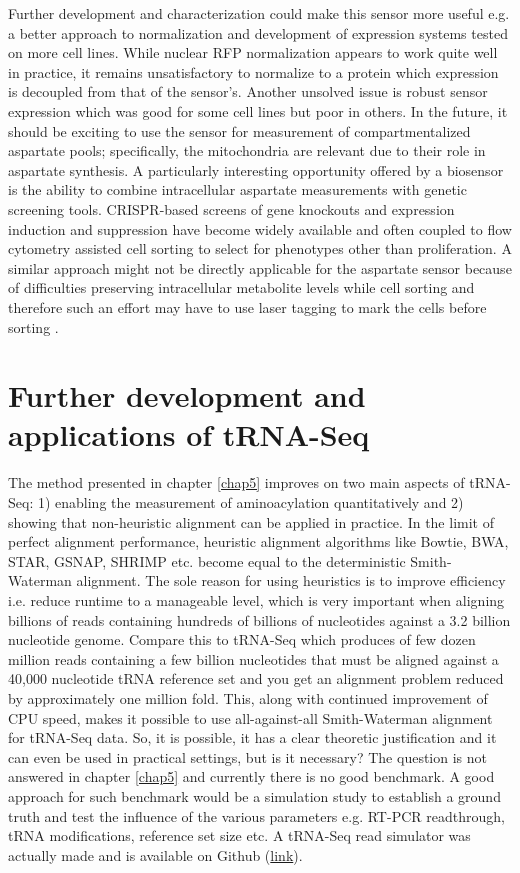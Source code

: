 Further development and characterization could make this sensor more useful e.g. a better approach to normalization and development of expression systems tested on more cell lines.
While nuclear RFP normalization appears to work quite well in practice, it remains unsatisfactory to normalize to a protein which expression is decoupled from that of the sensor's.
Another unsolved issue is robust sensor expression which was good for some cell lines but poor in others.
In the future, it should be exciting to use the sensor for measurement of compartmentalized aspartate pools; specifically, the mitochondria are relevant due to their role in aspartate synthesis.
A particularly interesting opportunity offered by a biosensor is the ability to combine intracellular aspartate measurements with genetic screening tools.
CRISPR-based screens of gene knockouts and expression induction and suppression have become widely available and often coupled to flow cytometry assisted cell sorting to select for phenotypes other than proliferation.
A similar approach might not be directly applicable for the aspartate sensor because of difficulties preserving intracellular metabolite levels while cell sorting and therefore such an effort may have to use laser tagging to mark the cells before sorting \cite{Binan2016-hn, Hasle2020-vb}.




\section{Further development and applications of tRNA-Seq}
The method presented in chapter \ref{chap5} improves on two main aspects of tRNA-Seq: 1) enabling the measurement of aminoacylation quantitatively and 2) showing that non-heuristic alignment can be applied in practice.
In the limit of perfect alignment performance, heuristic alignment algorithms like Bowtie, BWA, STAR, GSNAP, SHRIMP etc. become equal to the deterministic Smith-Waterman alignment.
The sole reason for using heuristics is to improve efficiency i.e. reduce runtime to a manageable level, which is very important when aligning billions of reads containing hundreds of billions of nucleotides against a 3.2 billion nucleotide genome.
Compare this to tRNA-Seq which produces of few dozen million reads containing a few billion nucleotides that must be aligned against a 40,000 nucleotide tRNA reference set and you get an alignment problem reduced by approximately one million fold.
This, along with continued improvement of CPU speed, makes it possible to use all-against-all Smith-Waterman alignment for tRNA-Seq data.
So, it is possible, it has a clear theoretic justification and it can even be used in practical settings, but is it necessary?
The question is not answered in chapter \ref{chap5} and currently there is no good benchmark.
A good approach for such benchmark would be a simulation study to establish a ground truth and test the influence of the various parameters e.g. RT-PCR readthrough, tRNA modifications, reference set size etc.
A tRNA-Seq read simulator was actually made and is available on Github (\href{https://github.com/krdav/tRNA-charge-seq/blob/8a096d023d19dd8e6419460d72c1ea4051ffd64d/utils/code-of-limited-use/tRNA-Seq_simulator.ipynb}{link}).

